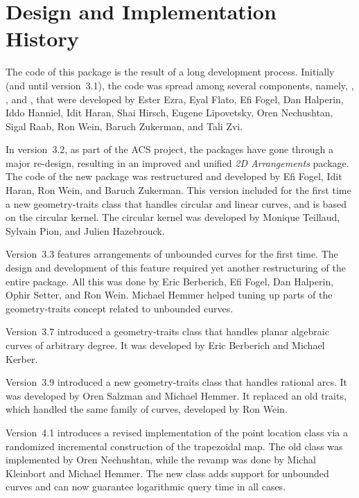\section*{Design and Implementation History}

The code of this package is the result of a long development process.
Initially (and until version~3.1), the code was spread among several
components, namely, , ,
 and , that were
developed by Ester Ezra, Eyal Flato, Efi Fogel, Dan Halperin, Iddo
Hanniel, Idit Haran, Shai Hirsch, Eugene Lipovetsky, Oren Nechushtan,
Sigal Raab, Ron Wein, Baruch Zukerman, and Tali Zvi.

In version~3.2, as part of the ACS project, the packages have gone
through a major re-design, resulting in an improved and unified
\emph{2D Arrangements} package.
The code of the new package was restructured and developed by
Efi Fogel, Idit Haran, Ron Wein, and Baruch Zukerman. This
version included for the first time a new geometry-traits
class that handles circular and linear curves, and is based
on the circular kernel. The circular kernel was developed
by Monique Teillaud, Sylvain Pion, and Julien Hazebrouck.

Version~3.3 features arrangements of unbounded curves for the first
time. The design and development of this feature required yet another
restructuring of the entire package. All this was done by Eric
Berberich, Efi Fogel, Dan Halperin, Ophir Setter, and Ron
Wein. Michael Hemmer helped tuning up parts of the geometry-traits 
concept related to unbounded curves.

Version~3.7 introduced a geometry-traits class
that handles planar algebraic curves of arbitrary degree.
It was developed by Eric Berberich and Michael Kerber.

Version~3.9 introduced a new geometry-traits class that handles
rational arcs. It was developed by Oren Salzman and Michael Hemmer.
It replaced an old traits, which handled the same family of
curves, developed by Ron Wein.

Version~4.1 introduces a revised implementation of the point location class
via a randomized incremental construction of the trapezoidal map. 
The old class was implemented by Oren Nechushtan, while the revamp 
was done by Michal Kleinbort and Michael Hemmer. The new class adds support 
for unbounded curves and can now guarantee logarithmic query time in all 
cases.


